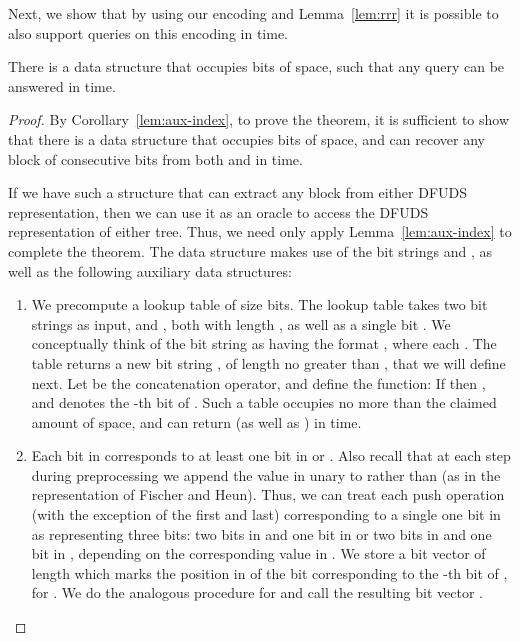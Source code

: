 \documentclass[runningheads]{llncs}
\begin{document}
Next, we show that by using our encoding and Lemma~\ref{lem:rrr} it
is possible to also support queries on this encoding in  time.

\begin{theorem}\label{thm:min-max-ub}
There is a data structure that occupies  bits of space,
such that any query  can be answered in 
time.
\end{theorem}

\begin{proof}
By Corollary~\ref{lem:aux-index}, to prove the theorem, it is
sufficient to show that there is a data structure that occupies  bits of space, and can recover any block of  consecutive
bits from both  and  in  time.

If we have such a structure that can extract any
block from either DFUDS representation, then we can use it as an
oracle to access the DFUDS representation of either tree.  Thus, we
need only apply Lemma~\ref{lem:aux-index} to complete the theorem.
The data structure makes use of the bit strings  and , as well
as the following auxiliary data structures:

\begin{enumerate}

\item We precompute a lookup table  of size
   bits.  The lookup table takes two bit
  strings as input,  and , both with length , as well as a single bit .  We conceptually think of the
  bit string  as having the format
  ,
  where each . The table returns a new bit string
  , of length no greater than , that we will
  define next.  Let  be the concatenation operator, and define
  the function:
   If  then , and
   denotes the -th bit of .  Such a table occupies no
  more than the claimed amount of space, and can return  (as well
  as ) in  time.

\item Each bit in  corresponds to at least one bit in  or
  .  Also recall that at each step during preprocessing we
  append the value  in unary to  rather than  (as
  in the representation of Fischer and Heun).  Thus, we can treat each
  push operation (with the exception of the first and last)
  corresponding to a single one bit in  as representing three bits:
  two bits in  and one bit in  or two bits in
   and one bit in , depending on the corresponding
  value in .  We store a bit vector  of length  which
  marks the position in  of the bit corresponding to the -th bit of , for .  We do the analogous procedure for  and call
  the resulting bit vector .


\end{enumerate}
\end{proof}
\end{document}
